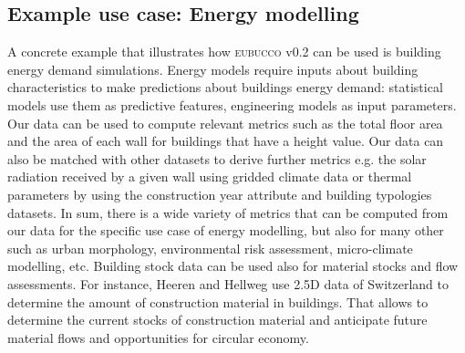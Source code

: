 \documentclass[fleqn,10pt]{wlscirep}
\begin{document}
\subsection*{Example use case: Energy modelling} 
A concrete example that illustrates how \textsc{eubucco} v0.2 can be used is building energy demand simulations. Energy models require inputs about building characteristics to make predictions about buildings energy demand: statistical models use them as predictive features, engineering models as input parameters. Our data can be used to compute relevant metrics such as the total floor area and the area of each wall for buildings that have a height value. Our data can also be matched with other datasets to derive further metrics e.g. the solar radiation received by a given wall using gridded climate data or thermal parameters by using the construction year attribute and building typologies datasets. In sum, there is a wide variety of metrics that can be computed from our data for the specific use case of energy modelling, but also for many other such as urban morphology, environmental risk assessment, micro-climate modelling, etc. 
Building stock data can be used also for material stocks and flow assessments. For instance, Heeren and Hellweg use 2.5D data of Switzerland to determine the amount of construction material in buildings. That allows to determine the current stocks of construction material and anticipate future material flows and opportunities for circular economy. \cite{heeren2019tracking}
\end{document}
